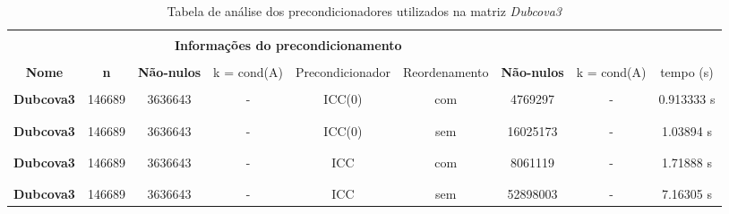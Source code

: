 
\begin{table}[ht]
    \centering
    \begin{tabular}{|c|c|c|c|c|c|c|c|c|}
        \hline \rowcolor{Gray}
        \multicolumn{9}{|c|}{\bfseries Tabela de analise dos precondicionadores }\\
        \hline \rowcolor{Gray}  \multicolumn{4}{|c|}{} & \multicolumn{5}{|c|}{} \\
         [-1em]  \rowcolor{Gray}
         \multicolumn{4}{|c|}{\bfseries Informações da matriz } & \multicolumn{5}{|c|}{\bfseries Informações do precondicionamento }\\
         \hline \rowcolor{Gray} & & & & & & & &  \\
         [-1em]
         \rowcolor{Gray}
         \bfseries Nome & \bfseries n & \bfseries Não-nulos &  
         k = cond(A) & Precondicionador & Reordenamento &
         \bfseries Não-nulos &  
         k = cond(A)  & tempo (s) \\
         \hline \\
         [-1em] \bfseries Dubcova3 & 146689 & 3636643 & - & ICC(0) & com & 4769297 & - & 0.913333 s \\ & & & & & & & & \\ [-1em] \hline \\
         [-1em] \bfseries Dubcova3 & 146689 & 3636643 & - & ICC(0) & sem & 16025173 & - & 1.03894 s \\ & & & & & & & & \\ [-1em] \hline \\
         [-1em] \bfseries Dubcova3 & 146689 & 3636643 & - & ICC & com & 8061119 & - & 1.71888 s \\ & & & & & & & & \\ [-1em] \hline \\
         [-1em] \bfseries Dubcova3 & 146689 & 3636643  & - & ICC & sem & 52898003 & - & 7.16305 s \\ \hline
    \end{tabular}
    \caption{Tabela de análise dos precondicionadores utilizados na matriz \textit{Dubcova3}}
    \label{tab:precond-Dub}
\end{table}


